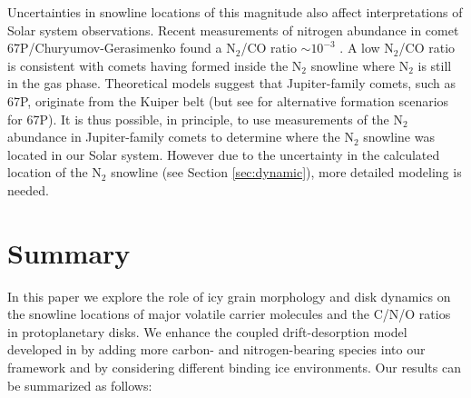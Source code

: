 \documentclass[apj]{emulateapj}
\begin{document}

Uncertainties in snowline locations of this magnitude also affect interpretations of Solar system observations. Recent measurements of nitrogen abundance in comet 67P/Churyumov-Gerasimenko found a N$_2$/CO ratio $\sim 10^{-3}$ \citep{rubin15}. A low N$_2$/CO ratio is consistent with comets having formed inside the N$_2$ snowline where N$_2$ is still in the gas phase. Theoretical models suggest that Jupiter-family comets, such as 67P, originate from the Kuiper belt \citep{duncan97} (but see \citealt{rubin15} for alternative formation scenarios for 67P). It is thus possible, in principle, to use measurements of the N$_2$ abundance in Jupiter-family comets to determine where the N$_2$ snowline was located in our Solar system. However due to the uncertainty in the calculated location of the N$_2$ snowline (see Section \ref{sec:dynamic}), more detailed modeling is needed. 



\section{Summary}
\label{sec:summary}

In this paper we explore the role of icy grain morphology and disk dynamics on the snowline locations of major volatile carrier molecules and the C/N/O ratios in protoplanetary disks. We enhance the coupled drift-desorption model developed in \citet{piso15b} by adding more carbon- and nitrogen-bearing species into our framework and by considering different binding ice environments. Our results can be summarized as follows:
\end{document}

